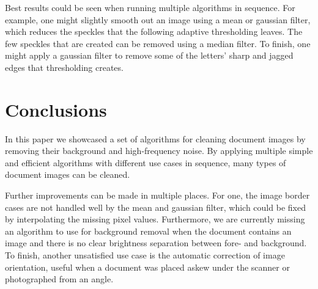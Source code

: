 \documentclass[sigconf]{acmart}
\begin{document}
Best results could be seen when running multiple algorithms in sequence. For example, one might slightly smooth out an image using a mean or gaussian filter, which reduces the speckles that the following adaptive thresholding leaves. The few speckles that are created can be removed using a median filter. To finish, one might apply a gaussian filter to remove some of the letters' sharp and jagged edges that thresholding creates.


\section{Conclusions}
In this paper we showcased a set of algorithms for cleaning document images by removing their background and high-frequency noise. By applying multiple simple and efficient algorithms with different use cases in sequence, many types of document images can be cleaned.

Further improvements can be made in multiple places. For one, the image border cases are not handled well by the mean and gaussian filter, which could be fixed by interpolating the missing pixel values. Furthermore, we are currently missing an algorithm to use for background removal when the document contains an image and there is no clear brightness separation between fore- and background. To finish, another unsatisfied use case is the automatic correction of image orientation, useful when a document was placed askew under the scanner or photographed from an angle.



\end{document}
